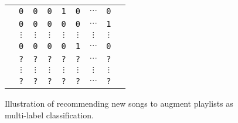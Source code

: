 \begin{figure}[!h]
\centering
\setlength{\tabcolsep}{1pt} %
\begin{tabular}{|*{9}{c}|} \hline
\rule{0em}{10pt}
& \texttt{0} & \texttt{0} & \texttt{0} & \texttt{1} & \texttt{0}  & $\cdots$ & \texttt{0} & \\
\vspace{-5pt}
& \texttt{0} & \texttt{0} & \texttt{0} & \texttt{0} & \texttt{0}  & $\cdots$ & \texttt{1} & \\
& $\vdots$ & $\vdots$ & $\vdots$ & $\vdots$ & $\vdots$ & $\vdots$ & $\vdots$ & \\
& \texttt{0} & \texttt{0} & \texttt{0} & \texttt{0} & \texttt{1}  & $\cdots$ & \texttt{0} & \\ \hline
\rowcolor[gray]{0.9}
\vspace{-3pt}
& \texttt{?} & \texttt{?} & \texttt{?} & \texttt{?} & \texttt{?}  & $\cdots$ & \texttt{?} & \rule{0em}{10pt} \\
\rowcolor[gray]{0.9}
& $\vdots$ & $\vdots$ & $\vdots$ & $\vdots$ & $\vdots$ & $\vdots$ & $\vdots$ &  \\
\rowcolor[gray]{0.9}
& \texttt{?} & \texttt{?} & \texttt{?} & \texttt{?} & \texttt{?}  & $\cdots$ & \texttt{?} & \\ \hline
\end{tabular}
\caption{Illustration of recommending new songs to augment playlists as multi-label classification.}
\label{fig:mlr}
\end{figure}
